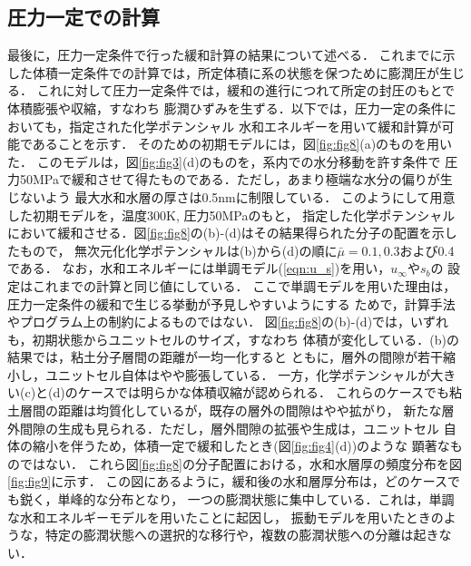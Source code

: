 \subsection{圧力一定での計算}
最後に，圧力一定条件で行った緩和計算の結果について述べる．
これまでに示した体積一定条件での計算では，所定体積に系の状態を保つために膨潤圧が生じる．
これに対して圧力一定条件では，緩和の進行につれて所定の封圧のもとで体積膨張や収縮，すなわち
膨潤ひずみを生ずる．以下では，圧力一定の条件においても，指定された化学ポテンシャル
水和エネルギーを用いて緩和計算が可能であることを示す．
そのための初期モデルには，図\ref{fig:fig8}(a)のものを用いた．
このモデルは，図\ref{fig:fig3}(d)のものを，系内での水分移動を許す条件で
圧力50MPaで緩和させて得たものである．ただし，あまり極端な水分の偏りが生じないよう
最大水和水層の厚さは0.5nmに制限している．
このようにして用意した初期モデルを，温度300K, 圧力50MPaのもと， 指定した化学ポテンシャル
において緩和させる．図\ref{fig:fig8}の(b)-(d)はその結果得られた分子の配置を示したもので，
無次元化化学ポテンシャルは(b)から(d)の順に$\bar{\mu}=0.1,0.3$および0.4である．
なお，水和エネルギーには単調モデル(\ref{eqn:u_s})を用い，$u_\infty$や$s_b$の
設定はこれまでの計算と同じ値にしている．
ここで単調モデルを用いた理由は，圧力一定条件の緩和で生じる挙動が予見しやすいようにする
ためで，計算手法やプログラム上の制約によるものではない．
図\ref{fig:fig8}の(b)-(d)では，いずれも，初期状態からユニットセルのサイズ，すなわち
体積が変化している．(b)の結果では，粘土分子層間の距離が一均一化すると
ともに，層外の間隙が若干縮小し，ユニットセル自体はやや膨張している．
一方，化学ポテンシャルが大きい(c)と(d)のケースでは明らかな体積収縮が認められる．
これらのケースでも粘土層間の距離は均質化しているが，既存の層外の間隙はやや拡がり，
新たな層外間隙の生成も見られる．ただし，層外間隙の拡張や生成は，ユニットセル
自体の縮小を伴うため，体積一定で緩和したとき(図\ref{fig:fig4}(d))のような
顕著なものではない．
これら図\ref{fig:fig8}の分子配置における，水和水層厚の頻度分布を図\ref{fig:fig9}に示す．
この図にあるように，緩和後の水和層厚分布は，どのケースでも鋭く，単峰的な分布となり，
一つの膨潤状態に集中している．これは，単調な水和エネルギーモデルを用いたことに起因し，
振動モデルを用いたときのような，特定の膨潤状態への選択的な移行や，複数の膨潤状態への分離は起きない．


